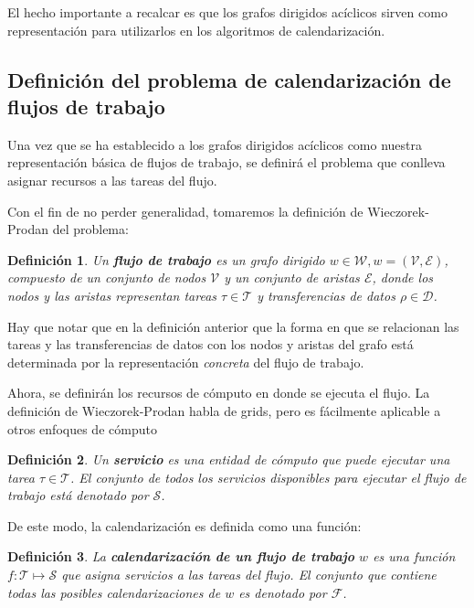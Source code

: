 \documentclass[letterpaper, 12pt]{report}
\newtheorem{defn}{Definición}
\begin{document}
El hecho importante a recalcar es que los grafos dirigidos acíclicos sirven como representación para utilizarlos en los algoritmos de calendarización.


\subsection{Definición del problema de calendarización de flujos de trabajo}
Una vez que se ha establecido a los grafos dirigidos acíclicos como nuestra representación básica de flujos de trabajo, se definirá el problema que conlleva asignar recursos a las tareas del flujo.

Con el fin de no perder generalidad, tomaremos la definición de Wieczorek-Prodan \cite{wieczorek2008taxonomies} del problema:

\begin{defn}
Un \textbf{flujo de trabajo} es un grafo dirigido $w \in \mathcal{W}, w = (\mathcal{V},\mathcal{E})$, compuesto de un conjunto de nodos $\mathcal{V}$ y un conjunto de aristas $\mathcal{E}$, donde los nodos y las aristas representan tareas $ \tau \in \mathcal{T}$ y transferencias de datos $ \rho \in \mathcal{D}$.
\end{defn}

Hay que notar que en la definición anterior que la forma en que se relacionan las tareas y las transferencias de datos con los nodos y aristas del grafo está determinada por la representación \emph{concreta} del flujo de trabajo.

Ahora, se definirán los recursos de cómputo en donde se ejecuta el flujo. La definición de Wieczorek-Prodan habla de grids, pero es fácilmente aplicable a otros enfoques de cómputo

\begin{defn}
Un \textbf{servicio} es una entidad de cómputo que puede ejecutar una tarea $\tau \in \mathcal{T}$. El conjunto de todos los servicios disponibles para ejecutar el flujo de trabajo está denotado por $\mathcal{S}$.
\end{defn}

De este modo, la calendarización es definida como una función:

\begin{defn}
La \textbf{calendarización de un flujo de trabajo} $w$ es una función $ f: \mathcal{T} \mapsto \mathcal{S}$ que asigna servicios a las tareas del flujo. El conjunto que contiene todas las posibles calendarizaciones de $w$ es denotado por $\mathcal{F}$.
\end{defn}
\end{document}
